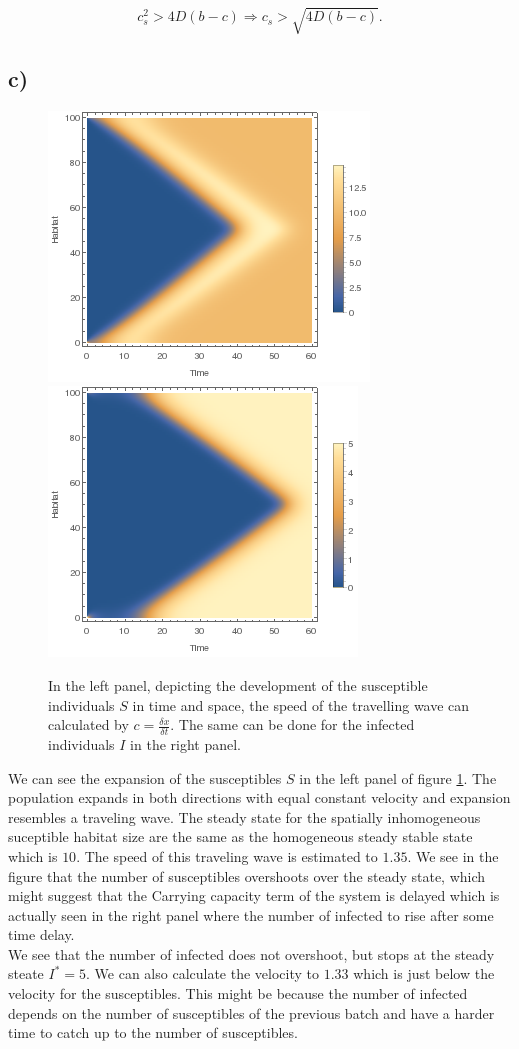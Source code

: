 $$
 c^2_s>4D(b-c)\Rightarrow c_s > \sqrt{4D(b-c)}.
 $$
 
\subsection*{c)}

\begin{figure}
\centering
\includegraphics[scale=0.5]{img/listdensityplot_S.png}
\includegraphics[scale=0.5]{img/listdensityplot_P.png}
\caption{\label{fig:pic1c} In the left panel, depicting the development of the susceptible individuals $S$ in time and space, the speed of the travelling wave can calculated by $c=\frac{\delta x}{\delta t}$. The same can be done for the infected individuals $I$ in the right panel.}
\end{figure}

We can see the expansion of the susceptibles $S$ in the left panel of figure \ref{fig:pic1c}. The population expands in both directions with equal constant velocity and expansion resembles a traveling wave. The steady state for the spatially inhomogeneous suceptible habitat size are the same as the homogeneous steady stable state which is $10$. The speed of this traveling wave is estimated to $1.35$. We see in the figure that the number of susceptibles overshoots over the steady state, which might suggest that the   Carrying capacity term of the system is delayed which is actually seen in the right panel where the number of infected to rise after some time delay. \\

We see that the number of infected does not overshoot, but stops at the steady steate $I^*=5$. We can also calculate the velocity to $1.33$ which is just below the velocity for the susceptibles. This might be because the number of infected depends on the number of susceptibles of the previous batch and have a harder time to catch up to the number of susceptibles.